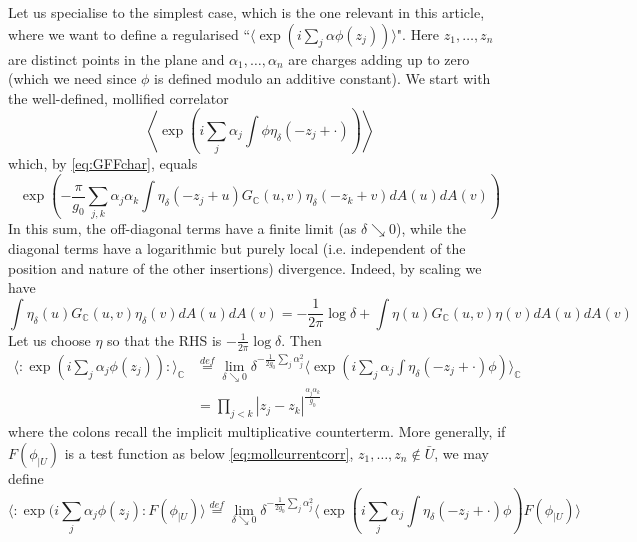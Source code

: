 \documentclass[10pt]{article}
\newcommand{\C}{\mathbb{C}}
\begin{document}
Let us specialise to the simplest case, which is the one relevant in this article, where we want to define a regularised ``$\langle\exp(i\sum_j\alpha\phi(z_j))\rangle$". Here $z_1,\dots,z_n$ are distinct points in the plane and $\alpha_1,\dots,\alpha_n$ are charges adding up to zero (which we need since $\phi$ is defined modulo an additive constant). We start with the well-defined, mollified correlator
$$\left\langle\exp\left(i\sum_j\alpha_j\int \phi\eta_\delta(-z_j+\cdot)\right)\right\rangle$$
which, by \eqref{eq:GFFchar}, equals 
$$\exp\left(-\frac{\pi}{g_0}\sum_{j,k}\alpha_j\alpha_k\int\eta_\delta(-z_j+u)G_\C(u,v)\eta_\delta(-z_k+v)dA(u)dA(v)\right)$$
In this sum, the off-diagonal terms have a finite limit (as $\delta\searrow 0$), while the diagonal terms have a logarithmic but purely local (i.e. independent of the position and nature of the other insertions) divergence. Indeed, by scaling we have
$$\int\eta_\delta(u)G_\C(u,v)\eta_\delta(v)dA(u)dA(v)=-\frac 1{2\pi}\log\delta+\int\eta(u)G_\C(u,v)\eta(v)dA(u)dA(v)$$
Let us choose $\eta$ so that the RHS is $-\frac 1{2\pi}\log\delta$. Then
\begin{equation}\label{eq:electcorrGFF}
\begin{array}{rl}
\langle :\exp(i\sum_j\alpha_j\phi(z_j)):\rangle_\C&\stackrel{def}{=}\lim_{\delta\searrow 0}\delta^{-\frac1{2g_0}\sum_j\alpha_j^2}\langle \exp(i\sum_j\alpha_j\int\eta_\delta(-z_j+\cdot)\phi)\rangle_\C\\
&=\prod_{j<k}|z_j-z_k|^{\frac {\alpha_j\alpha_k}{g_0}}
\end{array}
\end{equation}
where the colons recall the implicit multiplicative counterterm. More generally, if $F(\phi_{|U})$ is a test function as below \eqref{eq:mollcurrentcorr}, $z_1,\dots,z_n\notin\bar U$, we may define
$$\langle :\exp(i\sum_j\alpha_j\phi(z_j): F(\phi_{|U})\rangle\stackrel{def}{=}\lim_{\delta\searrow 0}\delta^{-\frac1{2g_0}\sum_j\alpha_j^2}\langle \exp(i\sum_j\alpha_j\int\eta_\delta(-z_j+\cdot)\phi)F(\phi_{|U})\rangle$$

%
%
%
%
%
%
%
\end{document}
